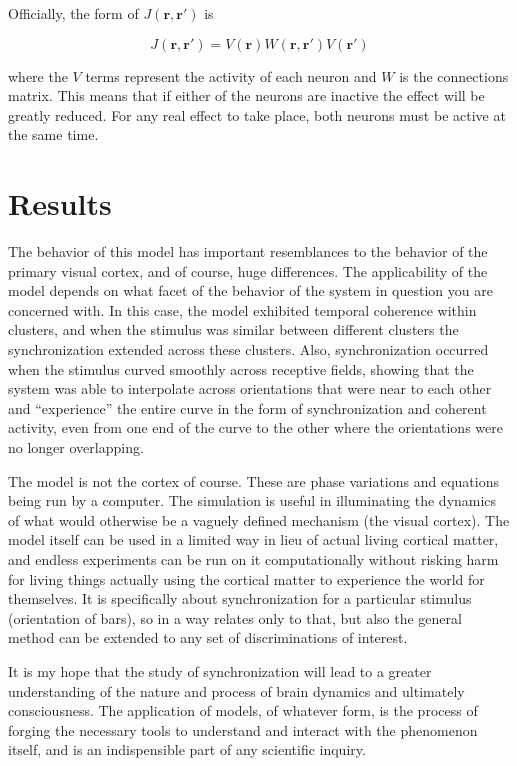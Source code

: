 \documentclass[12pt]{article}
\begin{document}
Officially, the form of $J(\mathbf{r},\mathbf{r'})$ is

$$ J(\mathbf{r},\mathbf{r'})=V(\mathbf{r})W(\mathbf{r},\mathbf{r'})V(\mathbf{r'}) $$

where the $V$ terms represent the activity of each neuron and $W$ is the connections matrix.  This means that if either of the neurons are inactive the effect will be greatly reduced.  For any real effect to take place, both neurons must be active at the same time.  

\section{Results}

The behavior of this model has important resemblances to the behavior of the primary visual cortex, and of course, huge differences.  The applicability of the model depends on what facet of the behavior of the system in question you are concerned with.  In this case, the model exhibited temporal coherence within clusters, and when the stimulus was similar between different clusters the synchronization extended across these clusters.  Also, synchronization occurred when the stimulus curved smoothly across receptive fields, showing that the system was able to interpolate across orientations that were near to each other and ``experience'' the entire curve in the form of synchronization and coherent activity, even from one end of the curve to the other where the orientations were no longer overlapping.  

The model is not the cortex of course.  These are phase variations and equations being run by a computer.  The simulation is useful in illuminating the dynamics of what would otherwise be a vaguely defined mechanism (the visual cortex).  The model itself can be used in a limited way in lieu of actual living cortical matter, and endless experiments can be run on it computationally without risking harm for living things actually using the cortical matter to experience the world for themselves.  It is specifically about synchronization for a particular stimulus (orientation of bars), so in a way relates only to that, but also the general method can be extended to any set of discriminations of interest. 

It is my hope that the study of synchronization will lead to a greater understanding of the nature and process of brain dynamics and ultimately consciousness.  The application of models, of whatever form, is the process of forging the necessary tools to understand and interact with the phenomenon itself, and is an indispensible part of any scientific inquiry.



\end{document}
